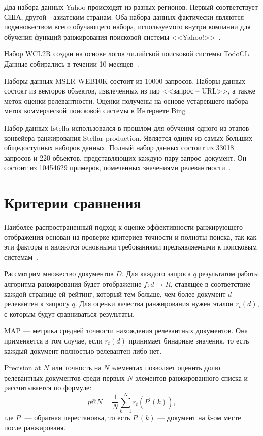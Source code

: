 Два набора данных Yahoo происходят из разных регионов. Первый соответствует США, другой  - азиатским странам. Оба набора данных фактически являются подмножеством всего обучающего набора, используемого внутри компании для обучения функций ранжирования поисковой системы <<Yahoo!>>~\cite{Yahoo}.

Набор WCL2R создан на основе логов чилийской поисковой системы TodoCL. Данные собирались в течении 10 месяцев~\cite{WCL2R}.

Наборы данных MSLR-WEB10K состоит из 10000 запросов. Наборы данных состоят из векторов объектов, извлеченных из пар <<запрос -- URL>>, а также меток оценки релевантности. Оценки получены на основе устаревшего набора меток коммерческой поисковой системы в Интернете Bing~\cite{MSLR}.

Набор данных Istella использовался в прошлом для обучения одного из этапов конвейера ранжирования Stellar production. Является одним из самых больших общедоступных наборов данных. Полный набор данных состоит из 33018 запросов и 220 объектов, представляющих каждую пару запрос--документ. Он состоит из 10454629 примеров, помеченных значениями релевантности~\cite{istella}.

\section{Критерии сравнения}

Наиболее распространенный подход к оценке эффективности ранжирующего отображения основан на проверке критериев точности и полноты поиска, так как эти факторы и являются основными требованиями предъявляемыми к поисковым системам~\cite{metrics}.

Рассмотрим множество документов $D$. Для каждого запроса $q$ результатом работы алгоритма ранжирования будет отображение $f: d \to R$, ставящее в соответствие каждой странице ей рейтинг, который тем больше, чем более документ $d$ релевантен к запросу $q$. Для оценки качества ранжирования нужен эталон $r_t(d)$, с которым будут сравниваться результаты.
 
MAP --- метрика средней точности нахождения релевантных документов. Она применяется в том случае, если $r_t(d)$ принимает бинарные значения, то есть каждый документ полностью  релевантен либо нет.

Precision at $N$ или точность на $N$ элементах позволяет оценить долю релевантных документов среди первых $N$ элементов ранжированного списка и рассчитывается по формуле:
\begin{equation}
	\label{eq:map1}
	p @ N=\frac{1}{N} \sum_{k=1}^N r_t(P^{\prime}(k)),
\end{equation}
где $P^{\prime}$ --- обратная перестановка, то есть $P^{\prime}(k)$ --- документ на $k$-ом месте после ранжированя.

